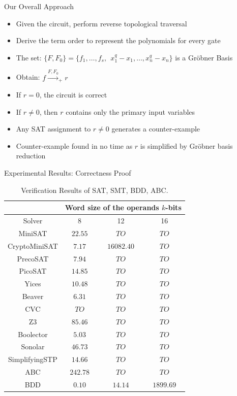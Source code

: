 \documentclass[xcolor=dvipsnames]{beamer}
\begin{document}
\begin{frame}{Our  Overall Approach}

\begin{itemize}
\item Given the circuit, perform reverse topological traversal
\item Derive the term order to represent the polynomials for every gate
\item The set: $\{F, F_0\} = \{f_1, \dots, f_s, ~~x_1^q - x_1, \dots, x_n^q -
  x_n\}$ is a Gr\"obner Basis
\item Obtain: $f \stackrel{F, F_0}{\textstyle\longrightarrow}_+ r$
\item If $r = 0$, the circuit is correct
\item If $r \neq 0$, then $r$ contains only the \alert{primary input
    variables}
\item Any SAT assignment to $r\neq 0$ generates a counter-example
\item Counter-example found in no time as $r$ is simplified by Gr\"obner basis reduction
\end{itemize}

\end{frame}



\begin{frame}{\large{Experimental Results: Correctness Proof}}
\vspace{-0.2in}

{\small
\begin{table}[h!]
\begin{center}
\caption{Verification Results of SAT, SMT, BDD, ABC. }
\begin{tabular}{|c||c|c|c|} \hline 
 & \multicolumn{3}{|c|}{Word size of the operands $k$-bits}\\ 
\hline
Solver & 8 & 12 & 16  \\
\hline \hline
MiniSAT& $22.55$& $TO$&$TO$  \\
\hline
CryptoMiniSAT &$7.17$&$16082.40$&$TO$  \\
\hline
PrecoSAT &$7.94$ &$TO$ &$TO$  \\
\hline
PicoSAT &$14.85$ &$TO$ &$TO$  \\
\hline \hline
Yices  &$10.48$ &$TO$ &$TO$ \\
\hline
Beaver &$6.31$ &$TO$ &$TO$  \\
\hline
CVC &$TO$ &$TO$ &$TO$  \\
\hline
Z3  &$85.46$ &$TO$ &$TO$ \\
\hline
Boolector &$5.03$&$TO$ &$TO$ \\
\hline 
Sonolar &$46.73$& $TO$ &$TO$  \\
\hline
SimplifyingSTP &$14.66$&$TO$ &$TO$  \\
\hline 
ABC &$242.78$&$TO$ &$TO$  \\
\hline \hline
BDD &$0.10$ &$14.14$ &$1899.69$  \\
\hline
\end{tabular}
\end{center}
\end{table}
}

\end{frame}
\end{document}
